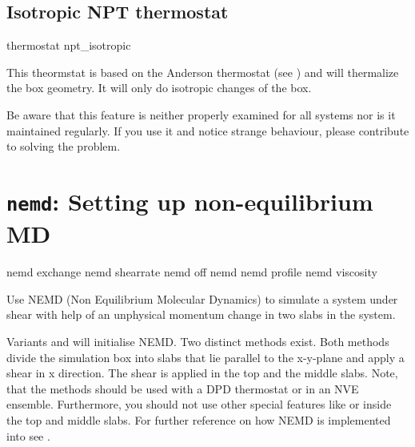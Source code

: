 \subsection{Isotropic NPT thermostat}
\label{ssec:NPTthermostat}
\begin{essyntax}
  thermostat npt_isotropic   
  \begin{features}
  \end{features}
\end{essyntax}

This theormstat is based on the Anderson thermostat (see
\cite{andersen80a, mann05d}) and will thermalize the box geometry. It
will only do isotropic changes of the box.

Be aware that this feature is neither properly examined for all
systems nor is it maintained regularly. If you use it and notice
strange behaviour, please contribute to solving the problem.

\section{\texttt{nemd}: Setting up non-equilibrium MD}
\label{sec:NEMD}

\begin{essyntax}
  nemd exchange  
  nemd shearrate  
  nemd off
  nemd
  nemd profile
  nemd viscosity
  \begin{features}
  \end{features}
\end{essyntax}

Use NEMD (Non Equilibrium Molecular Dynamics) to simulate a system
under shear with help of an unphysical momentum change in two slabs in
the system.

Variants  and  will initialise NEMD. Two
distinct methods exist.  Both methods divide the simulation box into
 slabs that lie parallel to the x-y-plane and apply a
shear in x direction.  The shear is applied in the top and the middle
slabs. Note, that the methods should be used with a DPD thermostat or
in an NVE ensemble.  Furthermore, you should not use other special
features like  or  inside the
top and middle slabs. For further reference on how NEMD is implemented
into \es see \cite{soddeman01a}.


